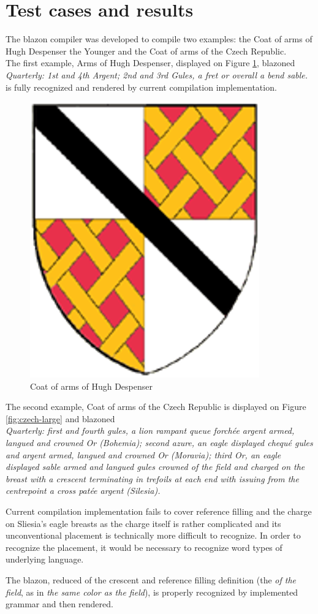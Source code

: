 \documentclass[12pt,a4paper]{article}
\let\oldsection\section
\renewcommand\section{\clearpage\oldsection}
\begin{document}
\section{Test cases and results}
The blazon compiler was developed to compile two examples: the Coat of arms of Hugh Despenser the Younger and the Coat of arms of the Czech Republic.\\

The first example, Arms of Hugh Despenser, displayed on Figure \ref{fig:despenser}, blazoned \\
\textit{ Quarterly: 1st and 4th Argent; 2nd and 3rd Gules, a fret or overall a bend sable.}
is fully recognized and rendered by current compilation implementation.

\begin{figure}[h]
	\centering
	\includegraphics[width=0.2\linewidth]{img/Despenser}
	\caption{Coat of arms of Hugh Despenser}
	\label{fig:despenser}
\end{figure}


The second example, Coat of arms of the Czech Republic is displayed on Figure \ref{fig:czech-large} and blazoned \\
\textit{Quarterly: first and fourth gules, a lion rampant queue forchée argent armed, langued and crowned Or (Bohemia); second azure, an eagle displayed chequé gules and argent armed, langued and crowned Or (Moravia); third Or, an eagle displayed sable armed and langued gules crowned of the field and charged on the breast with a crescent terminating in trefoils at each end with issuing from the centrepoint a cross patée argent (Silesia).}

Current compilation implementation fails to cover reference filling and the charge on Sliesia's eagle breasts as the charge itself is rather complicated and its unconventional placement is technically more difficult to recognize.
In order to recognize the placement, it would be necessary to recognize word types of underlying language.

The blazon, reduced of the crescent and reference filling definition (the \textit{of the field}, as in \textit{the same color as the field}), is properly recognized by implemented grammar and then rendered.
\end{document}
